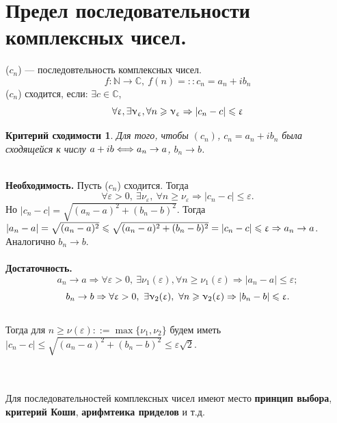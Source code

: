\section{Предел последовательности комплексных чисел.}
($c_n$) --- последовтельность комплексных чисел.\\
$$f:\mathbb{N}\rightarrow\mathbb{C},\ f(n) = ::c_n = a_n + ib_n$$
($c_n$) сходится, если: $\exists c \in \mathbb{C}$,
$$\forall\upvarepsilon,\exists\upnu_\upvarepsilon,\forall n\geqslant\upnu_\upvarepsilon\Rightarrow|c_n-c|\leqslant\upvarepsilon$$
\newtheorem*{ks}{Критерий сходимости}
\begin{ks}
	Для того, чтобы $(c_n)$, $c_n=a_n+ib_n$ была сходящейся к числу $a+ib\Longleftrightarrow a_n\rightarrow a$, $b_n\rightarrow b$.
\end{ks}
\begin{Proof}\\
	\textbf{Необходимость.} Пусть ($c_n$) сходится. Тогда $$\forall\varepsilon>0,\  \exists\nu_\varepsilon,\ \forall n\geqslant\nu_\varepsilon\Rightarrow|c_n-c|\leqslant\varepsilon.$$ Но $|c_n-c|=\sqrt{(a_n-a)^2+(b_n-b)^2}$. Тогда $|a_n-a| = \sqrt{(a_n-a)^2}\leqslant\sqrt{(a_n-a)^2+(b_n-b)^2}=|c_n-c|\leqslant\upvarepsilon\Rightarrow a_n\rightarrow a$. Аналогично $b_n\rightarrow b$.\\\\
	\textbf{Достаточность.}
	$$a_n\rightarrow a\Rightarrow\forall\varepsilon>0,\ \exists\nu_1(\varepsilon), \forall n \geqslant \nu_1(\varepsilon)\Rightarrow|a_n-a|\leqslant\varepsilon;$$
	$$b_n\ra b\Ra\forall\varepsilon > 0,\ \exists\nu_2(\varepsilon),\ \forall n\geqslant\nu_2(\varepsilon)\Ra|b_n-b|\leqslant\varepsilon.$$\\
	Тогда для $n\geqslant\nu(\varepsilon)::=\max\{\nu_1,\nu_2\}$ будем иметь $|c_n - c|\leqslant\sqrt{(a_n-a)^2 + (b_n-b)^2}\leqslant\varepsilon\sqrt{2}.$
\end{Proof}\\\\
Для последовательностей комплексных чисел имеют место \textbf{принцип выбора}, \textbf{критерий Коши}, \textbf{арифмтеика приделов} и т.д.